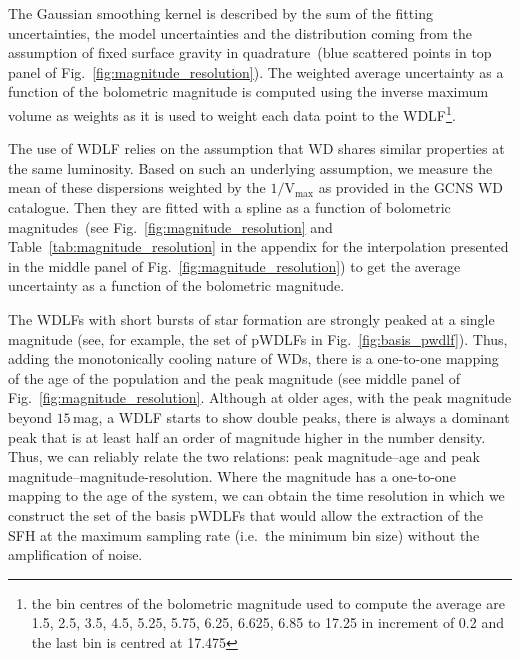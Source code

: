 \documentclass[fleqn,usenatbib]{mnras}
\begin{document}
The Gaussian smoothing kernel is described by the sum of the fitting
uncertainties, the model uncertainties and the distribution coming from the
assumption of fixed surface gravity in quadrature~(blue scattered points in top
panel of Fig.~\ref{fig:magnitude_resolution}). The weighted average uncertainty
as a function of the bolometric magnitude is computed using the inverse maximum
volume as weights as it is used to weight each data point to the WDLF\footnote{
the bin centres of the bolometric magnitude used to compute the average are
1.5,  2.5,  3.5,  4.5,  5.25,  5.75,  6.25,  6.625, 6.85 to 17.25 in increment
of 0.2 and the last bin is centred at 17.475}.

The use of WDLF relies on the assumption that WD shares similar properties
at the same luminosity. Based on such an underlying assumption, we measure
the mean of these dispersions weighted by the $1/\mathrm{V}_{\mathrm{max}}$
as provided in the GCNS WD catalogue. Then they are fitted with a spline as
a function of bolometric magnitudes~(see Fig.~\ref{fig:magnitude_resolution}
and Table~\ref{tab:magnitude_resolution} in the appendix for the interpolation
presented in the middle panel of Fig.~\ref{fig:magnitude_resolution}) to get
the average uncertainty as a function of the bolometric magnitude.

The WDLFs with short bursts of star formation are strongly peaked at a single
magnitude (see, for example, the set of pWDLFs in Fig.~\ref{fig:basis_pwdlf}).
Thus, adding the monotonically cooling nature of WDs, there is a one-to-one
mapping of the age of the population and the peak magnitude (see middle panel
of Fig.~\ref{fig:magnitude_resolution}. Although at older ages, with the peak
magnitude beyond $15$\,mag, a WDLF starts to show double peaks, there is always
a dominant peak that is at least half an order of magnitude higher in the
number density. Thus, we can reliably relate the two relations: peak
magnitude--age and peak magnitude--magnitude-resolution. Where the magnitude
has a one-to-one mapping to the age of the system, we can obtain the time
resolution in which we construct the set of the basis pWDLFs that would allow
the extraction of the SFH at the maximum sampling rate (i.e.\ the minimum bin
size) without the amplification of noise.
\end{document}
